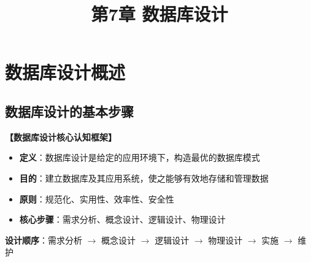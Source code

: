 \documentclass[12pt, a4paper]{article}
\title{\textbf{第7章 数据库设计}}
\date{}
\newenvironment{bluebox}[1]{%
  \begin{trivlist}
  \item[\hskip\labelsep \textbf{#1}]
  \setlength{\parskip}{0.5ex}
  \setlength{\itemsep}{0.5ex}
}{%
  \end{trivlist}
  }
\begin{document}
\maketitle
\thispagestyle{empty}
\newpage

\section{数据库设计概述}

\subsection{数据库设计的基本步骤}

\begin{bluebox}{核心概念框架}
	\textbf{【数据库设计核心认知框架】}

	\begin{itemize}[leftmargin=*, nosep]
		\item \textbf{定义}：数据库设计是给定的应用环境下，构造最优的数据库模式
		\item \textbf{目的}：建立数据库及其应用系统，使之能够有效地存储和管理数据
		\item \textbf{原则}：规范化、实用性、效率性、安全性
		\item \textbf{核心步骤}：需求分析、概念设计、逻辑设计、物理设计
	\end{itemize}

	\textbf{设计顺序}：需求分析 $\to$ 概念设计 $\to$ 逻辑设计 $\to$ 物理设计 $\to$ 实施 $\to$ 维护
\end{bluebox}
\end{document}
